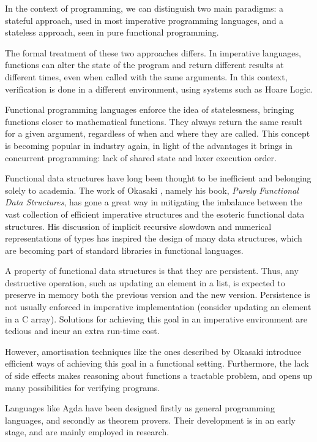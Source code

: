 \documentclass[12pt,twoside,notitlepage]{report}
\begin{document}
In the context of programming, we can distinguish two main paradigms: a stateful approach, used in most imperative programming languages, and a stateless approach, seen in pure functional programming.

The formal treatment of these two approaches differs. In imperative languages, functions can alter the state of the program and return different results at different times, even when called with the same arguments. In this context, verification is done in a different environment, using systems such as Hoare Logic.

Functional programming languages enforce the idea of statelessness, bringing functions closer to mathematical functions. They always return the same result for a given argument, regardless of when and where they are called. This concept is becoming popular in industry again, in light of the advantages it brings in concurrent programming: lack of shared state and laxer execution order.
 
Functional data structures have long been thought to be inefficient and belonging solely to academia. The work of Okasaki \cite{okasaki}, namely his book, \textit{Purely Functional Data Structures}, has gone a great way in mitigating the imbalance between the vast collection of efficient imperative structures and the esoteric functional data structures. His discussion of implicit recursive slowdown and numerical representations of types has inspired the design of many data structures, which are becoming part of standard libraries in functional languages.

A property of functional data structures is that they are persistent. Thus, any destructive operation, such as updating an element in a list, is expected to preserve in memory both the previous version and the new version. Persistence is not usually enforced in imperative implementation (consider updating an element in a C array). Solutions for achieving this goal in an imperative environment are tedious and incur an extra run-time cost. 

However, amortisation techniques like the ones described by Okasaki introduce efficient ways of achieving this goal in a functional setting. Furthermore, the lack of side effects makes reasoning about functions a tractable problem, and opens up many possibilities for verifying programs.

Languages like Agda\cite{agdatutorial} have been designed firstly as general programming languages, and secondly as  theorem provers. Their development is in an early stage, and are mainly employed in research. 
\end{document}
